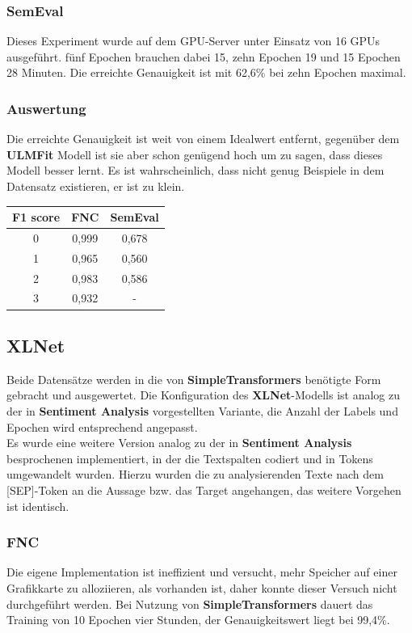 \subsubsection*{SemEval}
Dieses Experiment wurde auf dem GPU-Server unter Einsatz von 16 GPUs ausgef\"uhrt. f\"unf Epochen brauchen dabei 15, zehn Epochen 19 und 15 Epochen 28 Minuten. Die erreichte Genauigkeit ist mit 62,6\% bei zehn Epochen maximal.

\subsubsection*{Auswertung}
Die erreichte Genauigkeit ist weit von einem Idealwert entfernt, gegen\"uber dem \textbf{ULMFit} Modell ist sie aber schon gen\"ugend hoch um zu sagen, dass dieses Modell besser lernt. Es ist wahrscheinlich, dass nicht genug Beispiele in dem Datensatz existieren, er ist zu klein.
\begin{center}
\begin{tabular}{|c||c|c|}
\hline
F1 score & FNC & SemEval\\ 
\hline\hline
0 & 0,999 & 0,678\\
\hline
1 & 0,965 & 0,560\\ 
\hline
2 & 0,983 & 0,586\\
\hline
3 & 0,932 & -\\
\hline    
\end{tabular}
\end{center}

\subsection{XLNet}
Beide Datens\"atze werden in die von \textbf{SimpleTransformers} ben\"otigte Form gebracht und ausgewertet. Die Konfiguration des \textbf{XLNet}-Modells ist analog zu der in \textbf{Sentiment Analysis} vorgestellten Variante, die Anzahl der Labels und Epochen wird entsprechend angepasst.\\
Es wurde eine weitere Version analog zu der in \textbf{Sentiment Analysis} besprochenen implementiert, in der die Textspalten codiert und in Tokens umgewandelt wurden. Hierzu wurden die zu analysierenden Texte nach dem [SEP]-Token an die Aussage bzw. das Target angehangen, das weitere Vorgehen ist identisch.

\subsubsection*{FNC}
Die eigene Implementation ist ineffizient und versucht, mehr Speicher auf einer Grafikkarte zu alloziieren, als vorhanden ist, daher konnte dieser Versuch nicht durchgef\"uhrt werden.
Bei Nutzung von \textbf{SimpleTransformers} dauert das Training von 10 Epochen vier Stunden, der Genauigkeitswert liegt bei 99,4\%.

